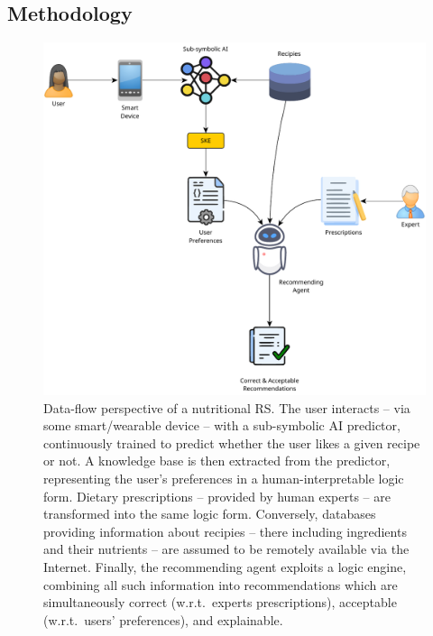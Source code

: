 \subsection{Methodology}\label{subsec:methodology}
%
\begin{figure}
  \centering
  \includegraphics[width=\textwidth]{figures/ske-recommender-workflow}
  \caption{
    Data-flow perspective of a nutritional \gls{RS}.
    The user interacts -- via some smart/wearable device -- with a sub-symbolic AI predictor, continuously trained to predict whether the user likes a given recipe or not.
    A knowledge base is then extracted from the predictor, representing the user's preferences in a human-interpretable logic form.
    Dietary prescriptions -- provided by human experts -- are transformed into the same logic form.
    Conversely, databases providing information about recipies -- there including ingredients and their nutrients -- are assumed to be remotely available via the Internet.
    Finally, the recommending agent exploits a logic engine, combining all such information into recommendations which are simultaneously correct (w.r.t.\ experts prescriptions), acceptable (w.r.t.\ users' preferences), and explainable.
  }
  \label{fig:ske-recommender-workflow}
\end{figure}

